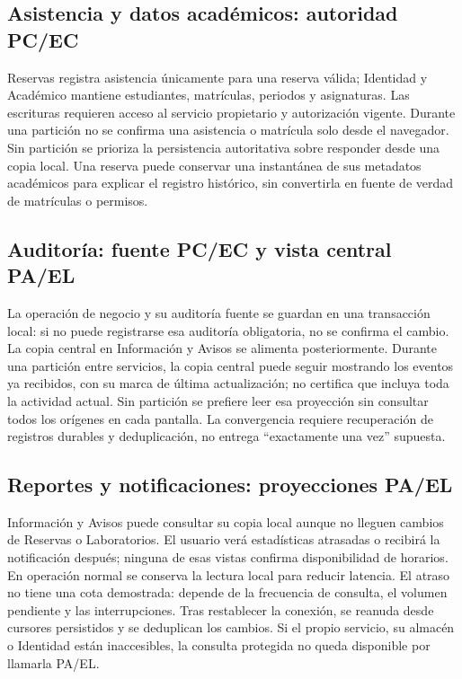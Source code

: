 \subsection{Asistencia y datos académicos: autoridad PC/EC}

Reservas registra asistencia únicamente para una reserva válida; Identidad y
Académico mantiene estudiantes, matrículas, periodos y asignaturas. Las escrituras
requieren acceso al servicio propietario y autorización vigente. Durante una
partición no se confirma una asistencia o matrícula solo desde el navegador.
Sin partición se prioriza la persistencia autoritativa sobre responder desde
una copia local. Una reserva puede conservar una instantánea de sus metadatos
académicos para explicar el registro histórico, sin convertirla en fuente de
verdad de matrículas o permisos.

\subsection{Auditoría: fuente PC/EC y vista central PA/EL}

La operación de negocio y su auditoría fuente se guardan en una transacción
local: si no puede registrarse esa auditoría obligatoria, no se confirma el
cambio. La copia central en Información y Avisos se alimenta posteriormente.
Durante una partición entre servicios, la copia central puede seguir mostrando
los eventos ya recibidos, con su marca de última actualización; no certifica
que incluya toda la actividad actual. Sin partición se prefiere leer esa
proyección sin consultar todos los orígenes en cada pantalla. La convergencia
requiere recuperación de registros durables y deduplicación, no entrega
``exactamente una vez'' supuesta.

\subsection{Reportes y notificaciones: proyecciones PA/EL}

Información y Avisos puede consultar su copia local aunque no lleguen cambios
de Reservas o Laboratorios. El usuario verá estadísticas atrasadas o recibirá
la notificación después; ninguna de esas vistas confirma disponibilidad de
horarios. En operación normal se conserva la lectura local para reducir latencia.
El atraso no tiene una cota demostrada: depende de la frecuencia de consulta,
el volumen pendiente y las interrupciones. Tras restablecer la conexión, se
reanuda desde cursores persistidos y se deduplican los cambios. Si el propio
servicio, su almacén o Identidad están inaccesibles, la consulta protegida no
queda disponible por llamarla PA/EL.

